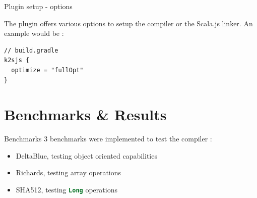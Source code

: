 \documentclass[10pt,usenames,dvipsnames]{beamer}
\newcommand{\inlinecode}[2]{\colorbox{minted-bg}{\lstinline[language=#1]$#2$}}
\newcommand{\ktinline}[1]{\inlinecode{kotlin}{#1}}
\begin{document}
\begin{frame}[fragile]{Plugin setup - options}

The plugin offers various options to setup the compiler or the Scala.js linker. An example would be :

 \begin{verbatim}
// build.gradle
k2sjs {
  optimize = "fullOpt"
}
 \end{verbatim}

\end{frame}



\section{Benchmarks \& Results}


\begin{frame}{Benchmarks}
  3 benchmarks were implemented to test the compiler :

 \begin{itemize}
  \item DeltaBlue, testing object oriented capabilities
  \item Richards, testing array operations
  \item SHA512, testing \ktinline{Long} operations
 \end{itemize}

\end{frame}
\end{document}
